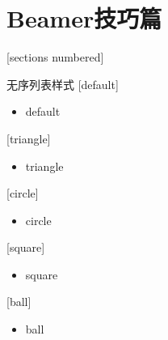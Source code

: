 \iffalse
\section{Beamer技巧篇}

[sections numbered]

\begin{frame}
\tableofcontents[hideallsubsections]
\tableofcontents[currentsubsection,subsectionstyle=hide]
\end{frame}

\begin{frame}{无序列表样式}
[default]
    \begin{itemize}
        \item default
    \end{itemize}

[triangle]
    \begin{itemize}
        \item triangle
    \end{itemize}

[circle]
    \begin{itemize}
        \item circle
    \end{itemize}

[square]
    \begin{itemize}
        \item square
    \end{itemize}

[ball]
    \begin{itemize}
        \item ball
    \end{itemize}

\end{frame}

